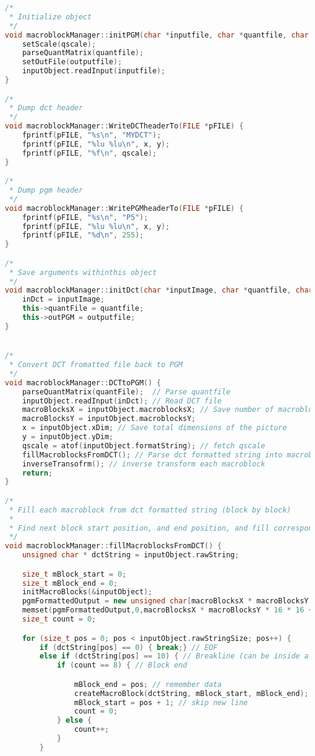 \documentclass{report}
\begin{document}
\begin{lstlisting}[language=C++]
/*
 * Initialize object
 */
void macroblockManager::initPGM(char *inputfile, char *quantfile, char *outputfile, char *qscale) {
    setScale(qscale);
    parseQuantMatrix(quantfile);
    setOutFile(outputfile);
    inputObject.readInput(inputfile);
}

/*
 * Dump dct header
 */
void macroblockManager::WriteDCTheaderTo(FILE *pFILE) {
    fprintf(pFILE, "%s\n", "MYDCT");
    fprintf(pFILE, "%lu %lu\n", x, y);
    fprintf(pFILE, "%f\n", qscale);
}

/*
 * Dump pgm header
 */
void macroblockManager::WritePGMheaderTo(FILE *pFILE) {
    fprintf(pFILE, "%s\n", "P5");
    fprintf(pFILE, "%lu %lu\n", x, y);
    fprintf(pFILE, "%d\n", 255);
}

/*
 * Save arguments withinthis object
 */
void macroblockManager::initDct(char *inputImage, char *quantfile, char *outputfile) {
    inDct = inputImage;
    this->quantFile = quantfile;
    this->outPGM = outputfile;
}


/*
 * Convert DCT fromatted file back to PGM
 */
void macroblockManager::DCTtoPGM() {
    parseQuantMatrix(quantFile);  // Parse quantfile
    inputObject.readInput(inDct); // Read DCT file
    macroBlocksX = inputObject.macroblocksX; // Save number of macroblocks
    macroBlocksY = inputObject.macroblocksY;
    x = inputObject.xDim; // Save total dimensions of the picture
    y = inputObject.yDim;
    qscale = atof(inputObject.formatString); // fetch qscale
    fillMacroblocksFromDCT(); // Parse dct formatted string into macroblocks
    inverseTransofrm(); // inverse transform each macroblock
    return;
}

/*
 * Fill each macroblock from dct formatted string (block by block)
 *
 * Find next block start position, and end position, and fill corresponding macroblock
 */
void macroblockManager::fillMacroblocksFromDCT() {
    unsigned char * dctString = inputObject.rawString;

    size_t mBlock_start = 0;
    size_t mBlock_end = 0;
    initMacroBlocks(&inputObject);
    pgmFormattedOutput = new unsigned char[macroBlocksX * macroBlocksY * 16 * 16 + 1];
    memset(pgmFormattedOutput,0,macroBlocksX * macroBlocksY * 16 * 16 + 1);
    size_t count = 0;

    for (size_t pos = 0; pos < inputObject.rawStringSize; pos++) {
        if (dctString[pos] == 0) { break;} // EOF
        else if (dctString[pos] == 10) { // Breakline (can be inside a block, need to check
            if (count == 8) { // Block end

                mBlock_end = pos; // remember data
                createMacroBlock(dctString, mBlock_start, mBlock_end);
                mBlock_start = pos + 1; // skip new line
                count = 0;
            } else {
                count++;
            }
        }


\end{lstlisting}
\end{document}
